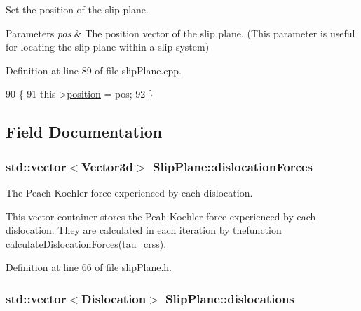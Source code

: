 Set the position of the slip plane. 


\begin{DoxyParams}{Parameters}
{\em pos} & The position vector of the slip plane. (This parameter is useful for locating the slip plane within a slip system) \\
\hline
\end{DoxyParams}


Definition at line 89 of file slip\-Plane.\-cpp.


\begin{DoxyCode}
90 \{
91   this->\hyperlink{classSlipPlane_ac2ac59e22e9638a990c9e45aaa096d9a}{position} = pos;
92 \}
\end{DoxyCode}


\subsection{Field Documentation}
\hypertarget{classSlipPlane_a2a74ae1f66a59e53a3ca0c9b81b28f7d}{
\subsubsection[{dislocation\-Forces}]{\setlength{\rightskip}{0pt plus 5cm}std\-::vector$<${\bf Vector3d}$>$ Slip\-Plane\-::dislocation\-Forces\hspace{0.3cm}{\ttfamily [protected]}}}\label{db/d25/classSlipPlane_a2a74ae1f66a59e53a3ca0c9b81b28f7d}


The Peach-\/\-Koehler force experienced by each dislocation. 

This vector container stores the Peah-\/\-Koehler force experienced by each dislocation. They are calculated in each iteration by thefunction calculate\-Dislocation\-Forces(tau\-\_\-crss). 

Definition at line 66 of file slip\-Plane.\-h.

\hypertarget{classSlipPlane_ad92c7c409f7e161db449528389180910}{
\subsubsection[{dislocations}]{\setlength{\rightskip}{0pt plus 5cm}std\-::vector$<${\bf Dislocation}$>$ Slip\-Plane\-::dislocations\hspace{0.3cm}{\ttfamily [protected]}}}\label{db/d25/classSlipPlane_ad92c7c409f7e161db449528389180910}


